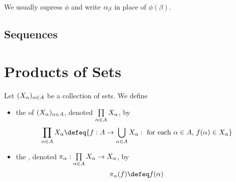 \documentclass{book}
\begin{document}
	\begin{note}
		We usually supress $\phi$ and write $\alpha_{\beta}$ in place of ${\phi(\beta)}$.
	\end{note}
	
	
	
	
	
	
	
	
	
	
	
	
	
	
	\subsection{Sequences}











































	\newpage
	
	\section{Products of Sets}
	
	\begin{defn} 
	Let $(X_{\alpha})_{\alpha \in A}$ be a collection of sets. We define 
	\begin{itemize}
		\item the  of $(X_{\alpha})_{\alpha \in A}$, denoted $\prod\limits_{\alpha \in A} X_{\alpha}$, by 
		$$\prod_{\al \in A}X_{\al} \defeq \{f:A \rightarrow \bigcup_{\al \in A} X_{\al}: \text{ for each $\al \in A$, $f(\al) \in X_{\al}$}\}$$
		\item the , denoted $\pi_{\alpha}:\prod\limits_{\alpha \in A}X_{\alpha} \rightarrow X_{\alpha}$, by 
		$$\pi_{\al}(f) \defeq f(\al)$$
	\end{itemize}
	\end{defn}
\end{document}
